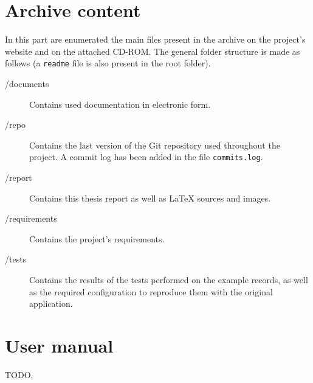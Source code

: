 
\chapter{Archive content}

In this part are enumerated the main files present in the archive on the project's website and on the attached CD-ROM. The general folder structure is made as follows (a \texttt{readme} file is also present in the root folder).

\begin{description}
\item[/documents] Contains used documentation in electronic form.
\item[/repo] Contains the last version of the Git repository used throughout the project. A commit log has been added in the file \texttt{commits.log}.
\item[/report] Contains this thesis report as well as \LaTeX{} sources and images.
\item[/requirements] Contains the project's requirements.
\item[/tests] Contains the results of the tests performed on the example records, as well as the required configuration to reproduce them with the original application.
\end{description}


\chapter{User manual}

TODO.